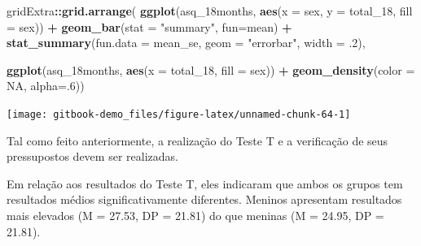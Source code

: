 \documentclass[
]{book}
\newenvironment{Shaded}{\begin{snugshade}}{\end{snugshade}}
\newcommand{\DataTypeTok}[1]{\textcolor[rgb]{0.13,0.29,0.53}{#1}}
\newcommand{\DecValTok}[1]{\textcolor[rgb]{0.00,0.00,0.81}{#1}}
\newcommand{\FloatTok}[1]{\textcolor[rgb]{0.00,0.00,0.81}{#1}}
\newcommand{\KeywordTok}[1]{\textcolor[rgb]{0.13,0.29,0.53}{\textbf{#1}}}
\newcommand{\NormalTok}[1]{#1}
\newcommand{\OperatorTok}[1]{\textcolor[rgb]{0.81,0.36,0.00}{\textbf{#1}}}
\newcommand{\OtherTok}[1]{\textcolor[rgb]{0.56,0.35,0.01}{#1}}
\newcommand{\StringTok}[1]{\textcolor[rgb]{0.31,0.60,0.02}{#1}}
\begin{document}
\begin{Shaded}
\begin{Highlighting}[]
\NormalTok{gridExtra}\OperatorTok{::}\KeywordTok{grid.arrange}\NormalTok{(}
  \KeywordTok{ggplot}\NormalTok{(asq_18months, }\KeywordTok{aes}\NormalTok{(}\DataTypeTok{x =}\NormalTok{ sex, }\DataTypeTok{y =}\NormalTok{ total_}\DecValTok{18}\NormalTok{, }\DataTypeTok{fill =}\NormalTok{ sex)) }\OperatorTok{+}
\StringTok{  }\KeywordTok{geom_bar}\NormalTok{(}\DataTypeTok{stat =} \StringTok{"summary"}\NormalTok{, }\DataTypeTok{fun=}\NormalTok{mean) }\OperatorTok{+}
\StringTok{  }\KeywordTok{stat_summary}\NormalTok{(}\DataTypeTok{fun.data =}\NormalTok{ mean_se, }\DataTypeTok{geom =} \StringTok{"errorbar"}\NormalTok{, }\DataTypeTok{width =} \FloatTok{.2}\NormalTok{),}

  \KeywordTok{ggplot}\NormalTok{(asq_18months, }\KeywordTok{aes}\NormalTok{(}\DataTypeTok{x =}\NormalTok{ total_}\DecValTok{18}\NormalTok{, }\DataTypeTok{fill =}\NormalTok{ sex)) }\OperatorTok{+}\StringTok{ }
\StringTok{  }\KeywordTok{geom_density}\NormalTok{(}\DataTypeTok{color =} \OtherTok{NA}\NormalTok{, }\DataTypeTok{alpha=}\NormalTok{.}\DecValTok{6}\NormalTok{))}
\end{Highlighting}
\end{Shaded}

\begin{center}\texttt{[image: gitbook-demo\_files/figure-latex/unnamed-chunk-64-1]} \end{center}

Tal como feito anteriormente, a realização do Teste T e a verificação de seus pressupostos devem ser realizadas.

Em relação aos resultados do Teste T, eles indicaram que ambos os grupos tem resultados médios significativamente diferentes. Meninos apresentam resultados mais elevados (M = 27.53, DP = 21.81) do que meninas (M = 24.95, DP = 21.81).

\begin{Shaded}
\end{Shaded}
\end{document}
